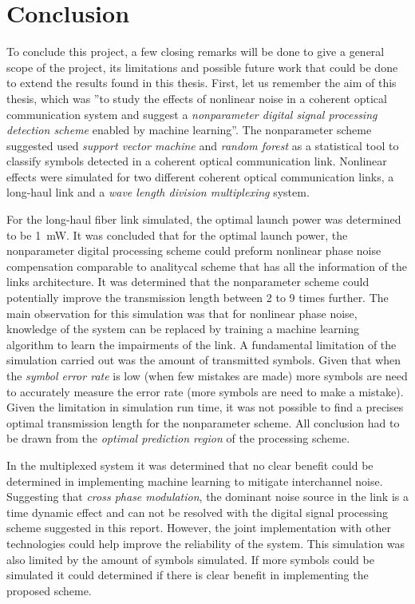 \chapter{Conclusion}\label{ch:con}


To conclude this project, a few closing remarks will be done to give a general scope of the project, its limitations and possible future work that could be done to extend the results found in this thesis. First, let us remember the  aim of this thesis, which was ''to study the effects of nonlinear noise in a coherent optical communication system and suggest a \textit{nonparameter digital signal processing detection scheme} enabled by machine learning''. The nonparameter scheme suggested used \textit{support vector machine} and \textit{random forest} as a statistical tool to classify symbols detected in a coherent optical communication link. Nonlinear effects were simulated for two different coherent optical communication links, a long-haul link and a \textit{wave length division multiplexing} system.

For the long-haul fiber link simulated, the optimal launch power was determined to be 1~mW. It was concluded that for the optimal launch power, the nonparameter digital processing scheme could preform nonlinear phase noise compensation comparable to analitycal scheme that has all the information of the links architecture. It was determined that the nonparameter  scheme could potentially improve the transmission length between 2 to 9 times further. The main observation for this simulation was that for nonlinear phase noise, knowledge of the system can be replaced by training a machine learning algorithm to learn the impairments of the link. A fundamental limitation of the simulation carried out was the amount of transmitted symbols. Given that when the \textit{symbol error rate} is low (when few mistakes are made) more symbols are need to accurately measure the error rate (more symbols are need to make a mistake). Given the limitation in simulation run time, it was not possible to find a precises optimal transmission length for the nonparameter scheme. All conclusion had to be drawn from the \textit{optimal prediction region} of the processing scheme.

In the multiplexed system it was determined that no clear benefit could be determined in implementing machine learning to mitigate interchannel noise. Suggesting that \textit{cross phase modulation}, the dominant noise source in the link is a time dynamic effect and can not be resolved with the digital signal processing scheme suggested in this report. However, the joint implementation with other technologies could help improve the reliability of the system. This simulation was also limited by the amount of symbols simulated. If more symbols could be simulated it could determined if there is clear benefit in implementing the proposed scheme. 

